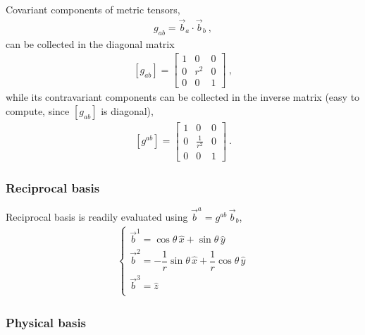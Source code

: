 \documentclass[letterpaper,10pt,english]{jupyterBook}
\begin{document}
\sphinxAtStartPar
Covariant components of metric tensors,
\begin{equation*}
\begin{split}g_{ab} = \vec{b}_a \cdot \vec{b}_b \ , \end{split}
\end{equation*}
\sphinxAtStartPar
can be collected in the diagonal matrix
\begin{equation*}
\begin{split}\left[ g_{ab} \right] = \begin{bmatrix} 1 & 0 & 0 \\ 0 & r^2 & 0 \\ 0 & 0 & 1 \end{bmatrix} \ ,\end{split}
\end{equation*}
\sphinxAtStartPar
while its contra\sphinxhyphen{}variant components can be collected in the inverse matrix (easy to compute, since \(\left[ g_{ab} \right]\) is diagonal),
\begin{equation*}
\begin{split}\left[ g^{ab} \right] = \begin{bmatrix} 1 & 0 & 0 \\ 0 & \frac{1}{r^2} & 0 \\ 0 & 0 & 1 \end{bmatrix} \ .\end{split}
\end{equation*}\subsubsection*{Reciprocal basis}

\sphinxAtStartPar
Reciprocal basis is readily evaluated using \(\vec{b}^a = g^{ab} \, \vec{b}_b\),
\begin{equation*}
\begin{split}\begin{cases}
\vec{b}^1 =  \cos \theta \, \hat{x} + \sin \theta \, \hat{y} \\
\vec{b}^2 =  - \dfrac{1}{r} \sin \theta \, \hat{x} + \dfrac{1}{r} \cos \theta \, \hat{y} \\
\vec{b}^3 =  \hat{z} \\
\end{cases}\end{split}
\end{equation*}\subsubsection*{Physical basis}
\end{document}
